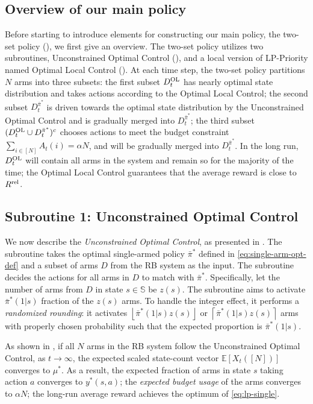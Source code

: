 \documentclass[11pt,letterpaper]{article}
\theoremstyle{plain}
\theoremstyle{definition}
\theoremstyle{remark}
\newcommand{\E}[1]{\mathbb{E}\left[#1\right]}
\newcommand{\ceil}[1]{\left\lceil#1\right\rceil}
\newcommand{\floor}[1]{\left\lfloor#1\right\rfloor}
\newcommand{\sspa}{\mathbb{S}}
\newcommand{\sumN}{\sum_{i\in[N]}}
\newcommand{\rel}{\textup{rel}} %
\newcommand{\ravg}{R}
\newcommand{\rrel}{\ravg^\rel}
\newcommand{\pibar}{{\sysbar{\pi}}}
\newcommand{\pibs}{{\pibar^*}}
\newcommand{\sysbar}[1]{\bar{#1}}
\newcommand{\statdist}{\mu^*}
\newcommand{\Da}{D^{\pibs}}
\newcommand{\Db}{D^{\textup{OL}}}
\begin{document}
\subsection{Overview of our main policy}
Before starting to introduce elements for constructing our main policy, the two-set policy (), we first give an overview.  
The two-set policy utilizes two subroutines, Unconstrained Optimal Control (), and a local version of LP-Priority named Optimal Local Control (). 
At each time step, the two-set policy partitions $N$ arms into three subsets: the first subset $\Db_t$ has nearly optimal state distribution and takes actions according to the Optimal Local Control; the second subset $\Da_t$ is driven towards the optimal state distribution by the Unconstrained Optimal Control and is gradually merged into $\Da_t$; the third subset $(\Db_t  \cup \Da_t)^c$ chooses actions to meet the budget constraint $\sumN A_t(i) = \alpha N$, and will be gradually merged into $\Da_t$. 
In the long run, $\Db_t$ will contain all arms in the system and remain so for the majority of the time; the Optimal Local Control guarantees that the average reward is close to $\rrel$. 





\subsection{Subroutine 1: Unconstrained Optimal Control}\label{sec:optimal-single-armed}

We now describe the \emph{Unconstrained Optimal Control}, as presented in . The subroutine takes the optimal single-armed policy $\pibs$ defined in \eqref{eq:single-arm-opt-def} and a subset of arms $D$ from the RB system as the input. The subroutine decides the actions for all arms in $D$ to match with $\pibs.$ Specifically, let the number of arms from $D$ in state $s\in \sspa$ be $z(s).$ The subroutine aims to activate $\pibs(1|s)$ fraction of the $z(s)$ arms. To handle the integer effect, it performs a \emph{randomized rounding}: it activates $\floor{\pibs(1|s) z(s)}$ or $\ceil{\pibs(1|s) z(s)}$ arms with properly chosen probability such that the expected proportion is $\pibs(1|s)$.  

As shown in , if all $N$ arms in the RB system follow the Unconstrained Optimal Control, as $t\to\infty$, 
the expected scaled state-count vector $\E{X_t([N])}$ converges to $\statdist$. As a result, the expected fraction of arms in state $s$ taking action $a$ converges to $y^*(s,a)$; 
the \emph{expected budget usage} of the arms converges to $\alpha N$; 
the long-run average reward achieves the optimum of \eqref{eq:lp-single}. 
\end{document}
